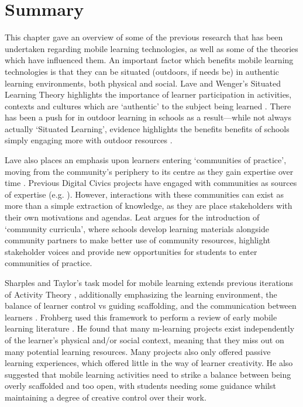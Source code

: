 \section{Summary}
This chapter gave an overview of some of the previous research that has been undertaken regarding mobile learning technologies, as well as some of the theories which have influenced them.
An important factor which benefits mobile learning technologies is that they can be situated (outdoors, if needs be) in authentic learning environments, both physical and social. Lave and Wenger's Situated Learning Theory highlights the importance of learner participation in activities, contexts and cultures which are `authentic' to the subject being learned \citep{lave1991situated}. There has been a push for in outdoor learning in schools as a result---while not always actually `Situated Learning', evidence highlights the benefits benefits of schools simply engaging more with outdoor resources \citep{Fiennes2015}.

Lave also places an emphasis upon learners entering `communities of practice', moving from the community's periphery to its centre as they gain expertise over time \citep{Lave1991}. Previous Digital Civics projects have engaged with communities as sources of expertise (e.g. \citep{Dodds2017, Rainey2019}). However, interactions with these communities can exist as more than a simple extraction of knowledge, as they are place stakeholders with their own motivations and agendas. Leat argues for the introduction of `community curricula', where schools develop learning materials alongside community partners to make better use of community resources, highlight stakeholder voices and provide new opportunities for students to enter communities of practice.

Sharples and Taylor's task model for mobile learning extends previous iterations of Activity Theory \citep{Engestrom2001}, additionally emphasizing the learning environment, the balance of learner control vs guiding scaffolding, and the communication between learners \citep{Sharples2007}. Frohberg used this framework to perform a review of early mobile learning literature \citep{Frohberg2009}. He found that many m-learning projects exist independently of the learner's physical and/or social context, meaning that they miss out on many potential learning resources. Many projects also only offered passive learning experiences, which offered little in the way of learner creativity. He also suggested that mobile learning activities need to strike a balance between being overly scaffolded and too open, with students needing some guidance whilst maintaining a degree of creative control over their work.

